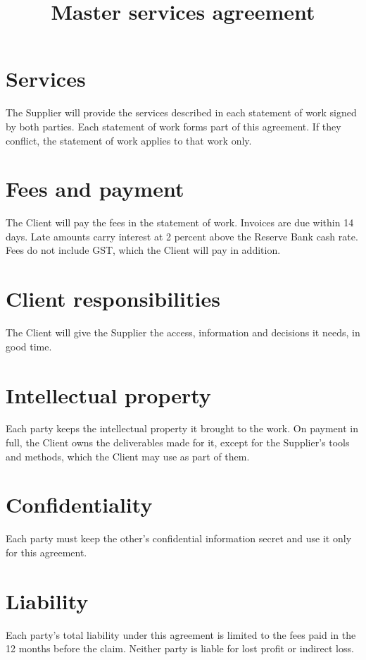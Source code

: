 \documentclass{jupiter-agreement}
\title{Master services agreement}
\begin{document}
\maketitle
{}
\jprowend

\section{Services}
\clause The Supplier will provide the services described in each statement of work signed by both parties.
\clause Each statement of work forms part of this agreement. If they conflict, the statement of work applies to that work only.

\section{Fees and payment}
\clause The Client will pay the fees in the statement of work. Invoices are due within 14 days.
\clause Late amounts carry interest at 2 percent above the Reserve Bank cash rate.
\clause Fees do not include GST, which the Client will pay in addition.

\section{Client responsibilities}
\clause The Client will give the Supplier the access, information and decisions it needs, in good time.

\section{Intellectual property}
\clause Each party keeps the intellectual property it brought to the work.
\clause On payment in full, the Client owns the deliverables made for it, except for the Supplier's tools and methods, which the Client may use as part of them.

\section{Confidentiality}
\clause Each party must keep the other's confidential information secret and use it only for this agreement.

\section{Liability}
\clause Each party's total liability under this agreement is limited to the fees paid in the 12 months before the claim.
\clause Neither party is liable for lost profit or indirect loss.
\end{document}
